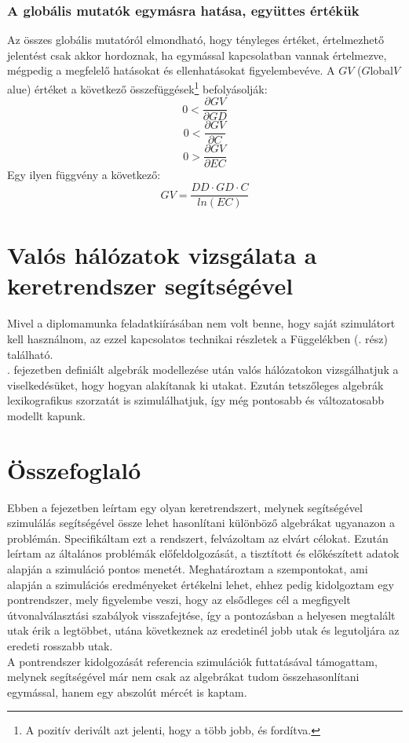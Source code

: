     \subsubsection{A globális mutatók egymásra hatása, együttes értékük}
    Az összes globális mutatóról elmondható, hogy tényleges értéket, értelmezhető jelentést csak akkor hordoznak, ha egymással kapcsolatban vannak értelmezve, mégpedig a megfelelő hatásokat és ellenhatásokat figyelembevéve. A $GV$ ($G$lobal$V$alue) értéket a következő összefüggések\footnote{A pozitív derivált azt jelenti, hogy a több jobb, és fordítva.} befolyásolják:
    $$0 < \frac{\partial GV}{\partial GD}$$
    $$0 < \frac{\partial GV}{\partial C}$$
    $$0 > \frac{\partial GV}{\partial EC}$$
    Egy ilyen függvény a következő:
    $$GV = \frac{DD \cdot GD \cdot C}{ln(EC)}$$

  \section{Valós hálózatok vizsgálata a keretrendszer segítségével}\label{section_real}
  Mivel a diplomamunka feladatkiírásában nem volt benne, hogy saját szimulátort kell használnom, az ezzel kapcsolatos technikai részletek a Függelékben (. rész) található.\\

  . fejezetben definiált algebrák modellezése után valós hálózatokon vizsgálhatjuk a viselkedésüket, hogy hogyan alakítanak ki utakat. Ezután tetszőleges algebrák lexikografikus szorzatát is szimulálhatjuk, így még pontosabb és változatosabb modellt kapunk.


  \section{Összefoglaló}
  Ebben a fejezetben leírtam egy olyan keretrendszert, melynek segítségével szimulálás segítségével össze lehet hasonlítani különböző algebrákat ugyanazon a problémán. Specifikáltam ezt a rendszert, felvázoltam az elvárt célokat. Ezután leírtam az általános problémák előfeldolgozását, a tisztított és előkészített adatok alapján a szimuláció pontos menetét. Meghatároztam a szempontokat, ami alapján a szimulációs eredményeket értékelni lehet, ehhez pedig kidolgoztam egy pontrendszer, mely figyelembe veszi, hogy az elsődleges cél a megfigyelt útvonalválasztási szabályok visszafejtése, így a pontozásban a helyesen megtalált utak érik a legtöbbet, utána következnek az eredetinél jobb utak és legutoljára az eredeti rosszabb utak.\\
  A pontrendszer kidolgozását referencia szimulációk futtatásával támogattam, melynek segítségével már nem csak az algebrákat tudom összehasonlítani egymással, hanem egy abszolút mércét is kaptam.
